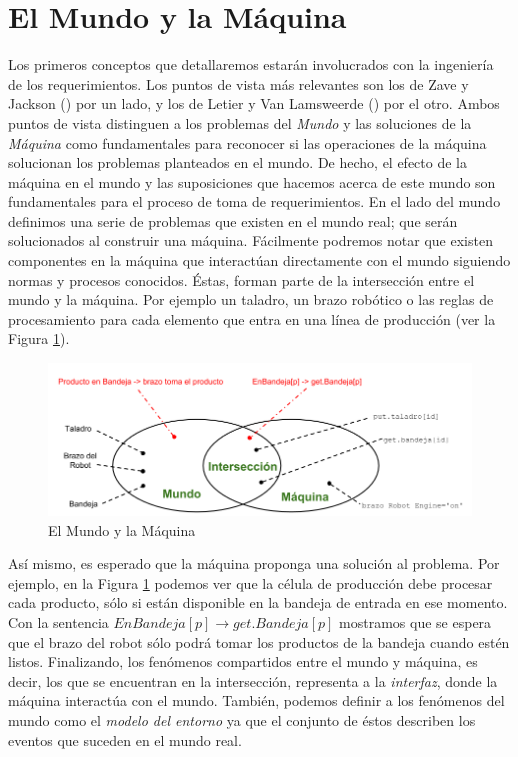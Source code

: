 \section{El Mundo y la Máquina}

Los primeros conceptos que detallaremos estarán involucrados con la ingeniería de los requerimientos. Los puntos de vista
más relevantes son los de Zave y Jackson (\cite{Zave97fourdark, Jackson:1995:SRA:210207, 5071113}) por un lado, y los de
Letier y Van Lamsweerde (\cite{879820, VanLamsweerde:2001:GRE:882477.883624}) por el otro. Ambos puntos de vista
distinguen a los problemas del \emph{Mundo} y las soluciones de la \emph{Máquina} como fundamentales para reconocer si 
las operaciones de la máquina solucionan los problemas planteados en el mundo. De hecho, el efecto de la máquina en el mundo y las
suposiciones que hacemos acerca de este mundo son fundamentales para el proceso de toma de requerimientos. En el lado
del mundo definimos una serie de problemas que existen en el mundo real; que serán solucionados al construir una máquina.
Fácilmente podremos notar que existen componentes en la máquina que interactúan directamente con el mundo siguiendo
normas y procesos conocidos. Éstas, forman parte de la intersección entre el mundo y la máquina. Por ejemplo un taladro,
un brazo robótico o las reglas de procesamiento para cada elemento que entra en una línea de producción (ver la Figura
\ref{world_and_machine}).

\begin{figure}
    \centering
    \includegraphics[scale=0.45]{img/world_and_machine.png}
    \caption{El Mundo y la Máquina}
    \label{world_and_machine}
\end{figure}

Así mismo, es esperado que la máquina proponga una solución al problema. Por ejemplo, en la Figura \ref{world_and_machine}
podemos ver que la célula de producción debe procesar cada producto, sólo si están disponible en la bandeja de entrada en ese
momento. Con la sentencia $EnBandeja[p] \rightarrow get.Bandeja[p]$ mostramos que se espera que el brazo del robot sólo
podrá tomar los productos de la bandeja cuando estén listos. Finalizando, los fenómenos compartidos entre el mundo y
máquina, es decir, los que se encuentran en la intersección, representa a la \emph{interfaz}, donde la máquina
interactúa con el mundo. También, podemos definir a los fenómenos del mundo como el \emph{modelo del entorno} ya que el
conjunto de éstos describen los eventos que suceden en el mundo real.

